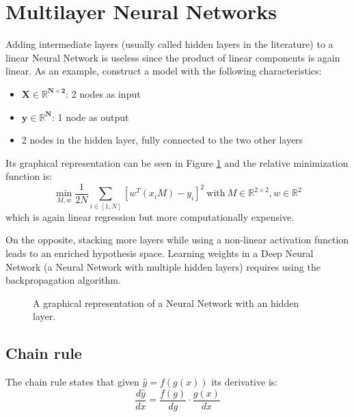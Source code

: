 \section{Multilayer Neural Networks}
Adding intermediate layers (usually called hidden layers in the literature)
to a linear Neural Network is useless
since the product of linear components is again linear.
As an example, construct a model with the following characteristics:
\begin{itemize}
    \item $\boldsymbol{X \in \mathbb{R}^{N \times 2}}$: 2 nodes as input
    \item $\boldsymbol{y \in \mathbb{R}^N}$: 1 node as output
    \item 2 nodes in the hidden layer, fully connected to the two other layers
\end{itemize}
Its graphical representation can be seen in Figure \ref{fig:nn-multi}
and the relative minimization function is:
\[ \displaystyle \min_{M, w} \frac{1}{2N} \sum_{i \in [1, N]} [ w^T (x_i M) - y_i ]^2
    \ \text{with} \
    M \in \mathbb{R}^{2 \times 2}, w \in \mathbb{R}^{2}\]
which is again linear regression but more computationally expensive.

On the opposite, stacking more layers while using a non-linear activation function
leads to an enriched hypothesis space. Learning weights in a Deep Neural Network
(a Neural Network with multiple hidden layers) requires using the backpropagation algorithm.

\begin{figure}[h]
    \centering
    \caption{A graphical representation of a Neural Network with an hidden layer.}
    \label{fig:nn-multi}
\end{figure}

\subsection{Chain rule}
The chain rule states that given $\hat{y} = f(g(x))$ its derivative is:
\[ \frac{d\hat{y}}{dx} = \frac{f(g)}{dg} \cdot \frac{g(x)}{dx} \]

